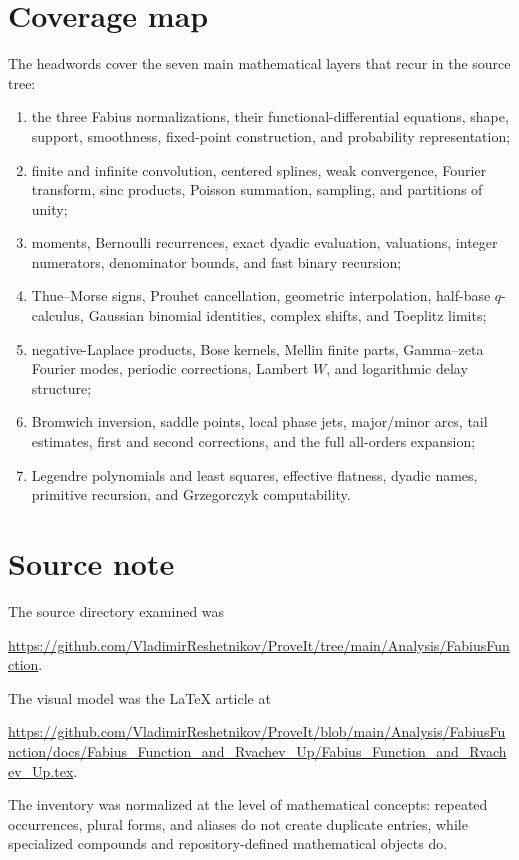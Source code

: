 \documentclass[11pt,oneside]{article}
\begin{document}
\section{Coverage map}
The headwords cover the seven main mathematical layers that recur in the source tree:
\begin{enumerate}
\item the three Fabius normalizations, their functional-differential equations, shape, support,
      smoothness, fixed-point construction, and probability representation;
\item finite and infinite convolution, centered splines, weak convergence, Fourier transform,
      sinc products, Poisson summation, sampling, and partitions of unity;
\item moments, Bernoulli recurrences, exact dyadic evaluation, valuations, integer numerators,
      denominator bounds, and fast binary recursion;
\item Thue--Morse signs, Prouhet cancellation, geometric interpolation, half-base $q$-calculus,
      Gaussian binomial identities, complex shifts, and Toeplitz limits;
\item negative-Laplace products, Bose kernels, Mellin finite parts, Gamma--zeta Fourier modes,
      periodic corrections, Lambert $W$, and logarithmic delay structure;
\item Bromwich inversion, saddle points, local phase jets, major/minor arcs, tail estimates,
      first and second corrections, and the full all-orders expansion;
\item Legendre polynomials and least squares, effective flatness, dyadic names, primitive
      recursion, and Grzegorczyk computability.
\end{enumerate}

\section{Source note}
The source directory examined was
\begin{center}
\url{https://github.com/VladimirReshetnikov/ProveIt/tree/main/Analysis/FabiusFunction}.
\end{center}
The visual model was the LaTeX article at
\begin{center}
\url{https://github.com/VladimirReshetnikov/ProveIt/blob/main/Analysis/FabiusFunction/docs/Fabius_Function_and_Rvachev_Up/Fabius_Function_and_Rvachev_Up.tex}.
\end{center}
The inventory was normalized at the level of mathematical concepts: repeated occurrences,
plural forms, and aliases do not create duplicate entries, while specialized compounds and
repository-defined mathematical objects do.
\end{document}

